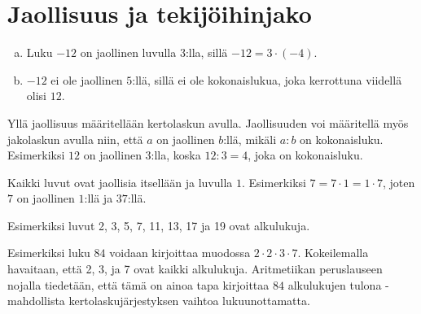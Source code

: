     \section{Jaollisuus ja tekijöihinjako}
    
    
    \begin{esimerkki}
    \begin{enumerate}[a)]
    \item Luku $-12$ on jaollinen luvulla $3$:lla, sillä $-12 = 3 \cdot (-4)$.
    \item $-12$ ei ole jaollinen $5$:llä, sillä ei ole kokonaislukua, joka kerrottuna viidellä olisi $12$.
    \end{enumerate}
    \end{esimerkki}
    
    
    Yllä jaollisuus määritellään kertolaskun avulla. Jaollisuuden voi määritellä myös jakolaskun avulla niin, että $a$ on jaollinen $b$:llä, mikäli $a:b$ on kokonaisluku. Esimerkiksi $12$ on jaollinen $3$:lla, koska $12:3 = 4$, joka on kokonaisluku.
   
    
    Kaikki luvut ovat jaollisia itsellään ja luvulla $1$. Esimerkiksi $7=7 \cdot 1=1 \cdot 7$, joten $7$ on jaollinen $1$:llä ja $37$:llä.
    
    
    Esimerkiksi luvut 2, 3, 5, 7, 11, 13, 17 ja 19 ovat alkulukuja. 
    
    
    
    Esimerkiksi luku $84$ voidaan kirjoittaa muodossa $2\cdot 2\cdot 3\cdot 7$. Kokeilemalla havaitaan, että 2, 3, ja 7 ovat kaikki alkulukuja. Aritmetiikan peruslauseen nojalla tiedetään, että tämä on ainoa tapa kirjoittaa $84$ alkulukujen tulona - mahdollista kertolaskujärjestyksen vaihtoa lukuunottamatta.
    
